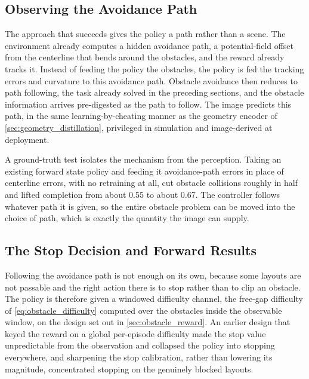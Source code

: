 \subsection{Observing the Avoidance Path}

The approach that succeeds gives the policy a path rather than a scene. The environment already computes a hidden avoidance path, a potential-field offset from the centerline that bends around the obstacles, and the reward already tracks it. Instead of feeding the policy the obstacles, the policy is fed the tracking errors and curvature to this avoidance path. Obstacle avoidance then reduces to path following, the task already solved in the preceding sections, and the obstacle information arrives pre-digested as the path to follow. The image predicts this path, in the same learning-by-cheating manner as the geometry encoder of \cref{sec:geometry_distillation}, privileged in simulation and image-derived at deployment.

A ground-truth test isolates the mechanism from the perception. Taking an existing forward state policy and feeding it avoidance-path errors in place of centerline errors, with no retraining at all, cut obstacle collisions roughly in half and lifted completion from about 0.55 to about 0.67. The controller follows whatever path it is given, so the entire obstacle problem can be moved into the choice of path, which is exactly the quantity the image can supply.

\subsection{The Stop Decision and Forward Results}

Following the avoidance path is not enough on its own, because some layouts are not passable and the right action there is to stop rather than to clip an obstacle. The policy is therefore given a windowed difficulty channel, the free-gap difficulty of \cref{eq:obstacle_difficulty} computed over the obstacles inside the observable window, on the design set out in \cref{sec:obstacle_reward}. An earlier design that keyed the reward on a global per-episode difficulty made the stop value unpredictable from the observation and collapsed the policy into stopping everywhere, and sharpening the stop calibration, rather than lowering its magnitude, concentrated stopping on the genuinely blocked layouts.

